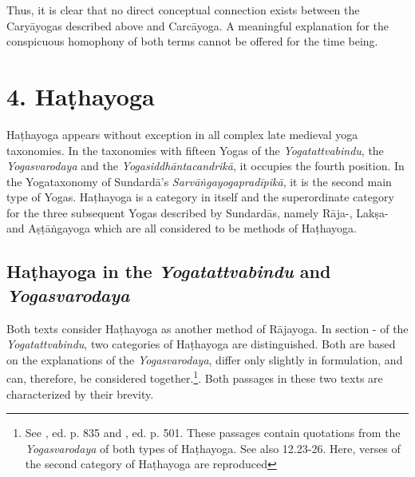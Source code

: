 Thus, it is clear that no direct conceptual connection exists between the Caryāyogas described above and Carcāyoga. A meaningful explanation for the conspicuous homophony of both terms cannot be offered for the time being.  

\section{4. Haṭhayoga}
\label{hathayogaintro}

Haṭhayoga appears without exception in all complex late medieval yoga taxonomies. In the taxonomies with fifteen Yogas of the \textit{Yogatattvabindu}, the \textit{Yogasvarodaya} and the \textit{Yogasiddhāntacandrikā}, it occupies the fourth position. In the Yogataxonomy of Sundardā's \textit{Sarvāṅgayogapradīpikā}, it is the second main type of Yogas. Haṭhayoga is a category in itself and the superordinate category for the three subsequent Yogas described by Sundardās, namely Rāja-, Lakṣa- and Aṣṭāṅgayoga which are all considered to be methods of Haṭhayoga. 

\subsection{Haṭhayoga in the \textit{Yogatattvabindu} and \textit{Yogasvarodaya}}

Both texts consider Haṭhayoga as another method of Rājayoga. In section - of the \textit{Yogatattvabindu}, two categories of Haṭhayoga are distinguished. Both are based on the explanations of the \textit{Yogasvarodaya}, differ only slightly in formulation, and can, therefore, be considered together.\footnote{See , ed. p. 835 and , ed. p. 501. These passages contain quotations from the \textit{Yogasvarodaya} of both types of Haṭhayoga. See also  12.23-26. Here, verses of the second category of Haṭhayoga are reproduced}. Both passages in these two texts are characterized by their brevity. 

